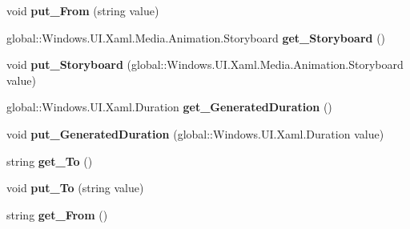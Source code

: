 \begin{DoxyCompactItemize}
void {\bfseries put\+\_\+\+From} (string value)
\item 
\mbox{\label{interface_windows_1_1_u_i_1_1_xaml_1_1_i_visual_transition_a6f0dce011fe22879ce853fb3d8cef56c}} 
global\+::\+Windows.\+U\+I.\+Xaml.\+Media.\+Animation.\+Storyboard {\bfseries get\+\_\+\+Storyboard} ()
\item 
\mbox{\label{interface_windows_1_1_u_i_1_1_xaml_1_1_i_visual_transition_a67e5ea20b8c0ab43ea43fbcb294ee975}} 
void {\bfseries put\+\_\+\+Storyboard} (global\+::\+Windows.\+U\+I.\+Xaml.\+Media.\+Animation.\+Storyboard value)
\item 
\mbox{\label{interface_windows_1_1_u_i_1_1_xaml_1_1_i_visual_transition_a09cacef636663545b9f3969686498197}} 
global\+::\+Windows.\+U\+I.\+Xaml.\+Duration {\bfseries get\+\_\+\+Generated\+Duration} ()
\item 
\mbox{\label{interface_windows_1_1_u_i_1_1_xaml_1_1_i_visual_transition_a9eeef6c9dd27db1e0a9d8951d3577e36}} 
void {\bfseries put\+\_\+\+Generated\+Duration} (global\+::\+Windows.\+U\+I.\+Xaml.\+Duration value)
\item 
\mbox{\label{interface_windows_1_1_u_i_1_1_xaml_1_1_i_visual_transition_aaa4594cccc2a043cd3cd99e9f5ea9668}} 
string {\bfseries get\+\_\+\+To} ()
\item 
\mbox{\label{interface_windows_1_1_u_i_1_1_xaml_1_1_i_visual_transition_a4ab6dd04f74a00e19e0faf126a5e040d}} 
void {\bfseries put\+\_\+\+To} (string value)
\item 
\mbox{\label{interface_windows_1_1_u_i_1_1_xaml_1_1_i_visual_transition_a1b4b88636fb838d2b6ce275f634f82f1}} 
string {\bfseries get\+\_\+\+From} ()
\item 
\mbox{\label{interface_windows_1_1_u_i_1_1_xaml_1_1_i_visual_transition_a8ee00acb9f48f20860a41022c311666b}} 

\end{DoxyCompactItemize}
